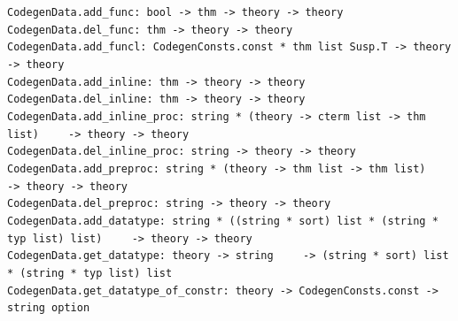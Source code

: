 \begin{isabellebody}
\begin{isamarkuptext}
\begin{description}
  \end{description}%
\end{isamarkuptext}%
\isamarkuptrue%
%
\endisatagmlref
{\isafoldmlref}%
%
\isadelimmlref
%
\endisadelimmlref
%
\isamarkuptrue%
%
\isadelimmlref
%
\endisadelimmlref
%
\isatagmlref
%
\begin{isamarkuptext}%
\begin{mldecls}
  \verb|CodegenData.add_func: bool -> thm -> theory -> theory| \\
  \verb|CodegenData.del_func: thm -> theory -> theory| \\
  \verb|CodegenData.add_funcl: CodegenConsts.const * thm list Susp.T -> theory -> theory| \\
  \verb|CodegenData.add_inline: thm -> theory -> theory| \\
  \verb|CodegenData.del_inline: thm -> theory -> theory| \\
  \verb|CodegenData.add_inline_proc: string * (theory -> cterm list -> thm list)|\isasep\isanewline%
\verb|    -> theory -> theory| \\
  \verb|CodegenData.del_inline_proc: string -> theory -> theory| \\
  \verb|CodegenData.add_preproc: string * (theory -> thm list -> thm list)|\isasep\isanewline%
\verb|    -> theory -> theory| \\
  \verb|CodegenData.del_preproc: string -> theory -> theory| \\
  \verb|CodegenData.add_datatype: string * ((string * sort) list * (string * typ list) list)|\isasep\isanewline%
\verb|    -> theory -> theory| \\
  \verb|CodegenData.get_datatype: theory -> string|\isasep\isanewline%
\verb|    -> (string * sort) list * (string * typ list) list| \\
  \verb|CodegenData.get_datatype_of_constr: theory -> CodegenConsts.const -> string option|
  \end{mldecls}

  \begin{description}


\end{description}
\end{isamarkuptext}
\end{isabellebody}
